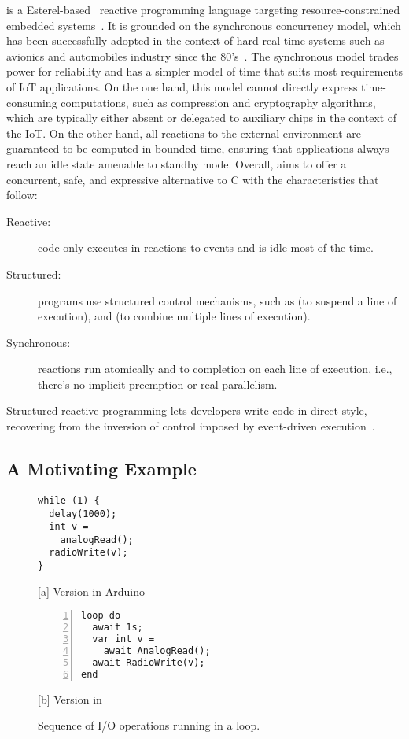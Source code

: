 \CEU is a Esterel-based~\cite{ceu.tecs17} reactive programming language
targeting resource-constrained embedded systems~\cite{ceu.sensys13}.
%
It is grounded on the synchronous concurrency model, which has been
successfully adopted in the context of hard real-time systems such as avionics
and automobiles industry since the 80's~\cite{rp.twelve}.
%
The synchronous model trades power for reliability and has a simpler model
of time that suits most requirements of IoT applications.
%
On the one hand, this model cannot directly express time-consuming
computations, such as compression and cryptography algorithms, which are
typically either absent or delegated to auxiliary chips in the context of the
IoT.
%
On the other hand, all reactions to the external environment are guaranteed to
be computed in bounded time, ensuring that applications always reach an idle
state amenable to standby mode.
%
Overall, \CEU aims to offer a concurrent, safe, and expressive alternative to C
with the characteristics that follow:
%
\begin{description}
\item [Reactive:] code only executes in reactions to events and is idle most of
    the time.
\item [Structured:] programs use structured control mechanisms, such as
     (to suspend a line of execution), and  (to combine
    multiple lines of execution).
\item [Synchronous:] reactions run atomically and to completion on each line of
    execution, i.e., there's no implicit preemption or real parallelism.
\end{description}
%
Structured reactive programming lets developers write code in direct style,
recovering from the inversion of control imposed by event-driven
execution~\cite{rp.deprecating,rp.rescala,sync_async.cooperative}.

\subsection*{A Motivating Example}
\label{sec.ceu.example}

{\linespread{1}
\begin{figure}[t]
\begin{minipage}[t]{0.49\linewidth}
\begin{lstlisting}[xrightmargin=0.5cm]
while (1) {
  delay(1000);
  int v =
    analogRead();
  radioWrite(v);
}
\end{lstlisting}
\centering\small{[a] Version in Arduino}
\end{minipage}
%
\begin{minipage}[t]{0.49\linewidth}
\begin{lstlisting}[numbers=left,xleftmargin=-0.2cm]
loop do
  await 1s;
  var int v =
    await AnalogRead();
  await RadioWrite(v);
end
\end{lstlisting}
\centering\small{[b] Version in \CEU}
\end{minipage}
\caption{ Sequence of I/O operations running in a loop.
\label{lst.direct}
}
\end{figure}
}

